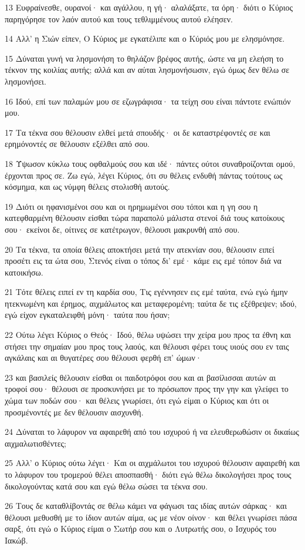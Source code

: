 \par 13 Ευφραίνεσθε, ουρανοί· και αγάλλου, η γή· αλαλάξατε, τα όρη· διότι ο Κύριος παρηγόρησε τον λαόν αυτού και τους τεθλιμμένους αυτού ελέησεν.
\par 14 Αλλ' η Σιών είπεν, Ο Κύριος με εγκατέλιπε και ο Κύριός μου με ελησμόνησε.
\par 15 Δύναται γυνή να λησμονήση το θηλάζον βρέφος αυτής, ώστε να μη ελεήση το τέκνον της κοιλίας αυτής; αλλά και αν αύται λησμονήσωσιν, εγώ όμως δεν θέλω σε λησμονήσει.
\par 16 Ιδού, επί των παλαμών μου σε εζωγράφισα· τα τείχη σου είναι πάντοτε ενώπιόν μου.
\par 17 Τα τέκνα σου θέλουσιν ελθεί μετά σπουδής· οι δε καταστρέφοντές σε και ερημόνοντές σε θέλουσιν εξέλθει από σου.
\par 18 Ύψωσον κύκλω τους οφθαλμούς σου και ιδέ· πάντες ούτοι συναθροίζονται ομού, έρχονται προς σε. Ζω εγώ, λέγει Κύριος, ότι συ θέλεις ενδυθή πάντας τούτους ως κόσμημα, και ως νύμφη θέλεις στολισθή αυτούς.
\par 19 Διότι οι ηφανισμένοι σου και οι ηρημωμένοι σου τόποι και η γη σου η κατεφθαρμένη θέλουσιν είσθαι τώρα παραπολύ μάλιστα στενοί διά τους κατοίκους σου· εκείνοι δε, οίτινες σε κατέτρωγον, θέλουσι μακρυνθή από σου.
\par 20 Τα τέκνα, τα οποία θέλεις αποκτήσει μετά την ατεκνίαν σου, θέλουσιν ειπεί προσέτι εις τα ώτα σου, Στενός είναι ο τόπος δι' εμέ· κάμε εις εμέ τόπον διά να κατοικήσω.
\par 21 Τότε θέλεις ειπεί εν τη καρδία σου, Τις εγέννησεν εις εμέ ταύτα, ενώ εγώ ήμην ητεκνωμένη και έρημος, αιχμάλωτος και μεταφερομένη; ταύτα δε τις εξέθρεψεν; ιδού, εγώ είχον εγκαταλειφθή μόνη· ταύτα που ήσαν;
\par 22 Ούτω λέγει Κύριος ο Θεός· Ιδού, θέλω υψώσει την χείρα μου προς τα έθνη και στήσει την σημαίαν μου προς τους λαούς, και θέλουσι φέρει τους υιούς σου εν ταις αγκάλαις και αι θυγατέρες σου θέλουσι φερθή επ' ώμων·
\par 23 και βασιλείς θέλουσιν είσθαι οι παιδοτρόφοι σου και αι βασίλισσαι αυτών αι τροφοί σου· θέλουσι σε προσκυνήσει με το πρόσωπον προς την γην και γλείφει το χώμα των ποδών σου· και θέλεις γνωρίσει, ότι εγώ είμαι ο Κύριος και ότι οι προσμένοντές με δεν θέλουσιν αισχυνθή.
\par 24 Δύναται το λάφυρον να αφαιρεθή από του ισχυρού ή να ελευθερωθώσιν οι δικαίως αιχμαλωτισθέντες;
\par 25 Αλλ' ο Κύριος ούτω λέγει· Και οι αιχμάλωτοι του ισχυρού θέλουσιν αφαιρεθή και το λάφυρον του τρομερού θέλει αποσπασθή· διότι εγώ θέλω δικολογήσει προς τους δικολογούντας κατά σου και εγώ θέλω σώσει τα τέκνα σου.
\par 26 Τους δε καταθλίβοντάς σε θέλω κάμει να φάγωσι τας ιδίας αυτών σάρκας· και θέλουσι μεθυσθή με το ίδιον αυτών αίμα, ως με νέον οίνον· και θέλει γνωρίσει πάσα σαρξ, ότι εγώ ο Κύριος είμαι ο Σωτήρ σου και ο Λυτρωτής σου, ο Ισχυρός του Ιακώβ.

